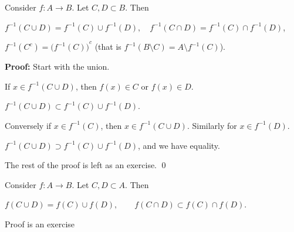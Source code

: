 \documentclass[10pt,aspectratio=169]{beamer}
\begin{document}
\begin{frame}


\begin{proposition}
Consider $f \colon A \to B$.  Let $C, D \subset B$.  \pause Then

\medskip
$f^{-1}( C \cup D) = f^{-1} (C) \cup f^{-1} (D) , \quad
f^{-1}( C \cap D) = f^{-1} (C) \cap f^{-1} (D)$,

\medskip
\pause
$f^{-1}( C^c) = {\bigl( f^{-1} (C) \bigr)}^c$
\quad
(that is $f^{-1}( B \setminus C) = A \setminus f^{-1} (C)$).
\end{proposition}

\pause
\textbf{Proof:}
Start with the union.

\pause
If $x \in f^{-1}( C \cup D)$, then $f(x) \in C$ or $f(x) \in D$.

\pause
\thus\quad  $f^{-1}( C \cup D) \subset f^{-1} (C) \cup f^{-1} (D)$.

\pause
Conversely if $x \in f^{-1}(C)$, then $x \in f^{-1}(C \cup D)$.
\pause
\quad Similarly for $x \in f^{-1}(D)$.

\pause

\thus \quad $f^{-1}( C \cup D) \supset f^{-1} (C) \cup f^{-1} (D)$, and we have
equality.

\medskip
\pause

The rest of the proof is left as an exercise.
\qed

\pause

\begin{proposition}
Consider $f \colon A \to B$.  Let $C, D \subset A$. \pause  Then

$f( C \cup D) = f (C) \cup f (D) , \qquad
f( C \cap D) \subset f (C) \cap f (D)$.
\end{proposition}

\pause
Proof is an exercise
\end{frame}
\end{document}

